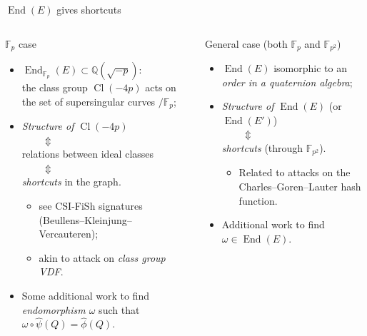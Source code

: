 \documentclass[aspectratio=169]{beamer}
\newcommand{\F}{\mathbb{F}}
\newcommand{\Q}{\mathbb{Q}}
\DeclareMathOperator{\End}{End}
\DeclareMathOperator{\Cl}{Cl}
\begin{document}
\begin{frame}{$\End(E)$ gives shortcuts}
  \begin{columns}
    \begin{column}{0.48\textwidth}
      \begin{block}{$\F_p$ case}
        \begin{itemize}
        \item \emph{$\End_{\F_p}(E) \subset \Q(\sqrt{-p})$}:\\
          the class group $\Cl(-4p)$ acts on the set of supersingular
          curves $/\F_p$;
        \item \emph{Structure of $\Cl(-4p)$}\\
          $\qquad\Updownarrow$\\
          relations between ideal classes\\
          $\qquad\Updownarrow$\\
          \emph{shortcuts} in the graph.
          \begin{itemize}
          \item see CSI-FiSh signatures (Beullens--Kleinjung--Vercauteren);
          \item akin to attack on \emph{class group VDF}.
          \end{itemize}
        \item Some additional work to find \emph{endomorphism $\omega$}
          such that \emph{$\omega\circ\hat\psi(Q) = \hat\phi(Q)$}.
        \end{itemize}
      \end{block}
    \end{column}
    \pause
    \begin{column}{0.48\textwidth}
      \begin{block}{General case (both $\F_p$ and $\F_{p^2}$)}
        \begin{itemize}
        \item \emph{$\End(E)$} isomorphic to an\\
          \emph{order in a quaternion algebra};
        \item \emph{Structure of $\End(E)$} (or $\End(E')$)\\
          $\qquad\Updownarrow$\\
          \emph{shortcuts} (through $\F_{p^2}$).
          \begin{itemize}
          \item Related to attacks on the Charles--Goren--Lauter hash
            function.
          \end{itemize}
        \item Additional work to find \emph{$\omega\in\End(E)$}.
        \end{itemize}


\end{block}
\end{column}
\end{columns}
\end{frame}
\end{document}
